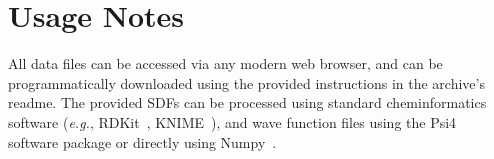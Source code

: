 \section*{Usage Notes}

All data files can be accessed via any modern web browser, and can be programmatically downloaded using the provided instructions in the archive's readme. The provided SDFs can be processed using standard cheminformatics software (\textit{e.g.}, RDKit~\cite{rdkit}, KNIME~\cite{knime}), and wave function files using the Psi4~\cite{smith2020psi4} software package or directly using Numpy~\cite{harris2020array}. 
